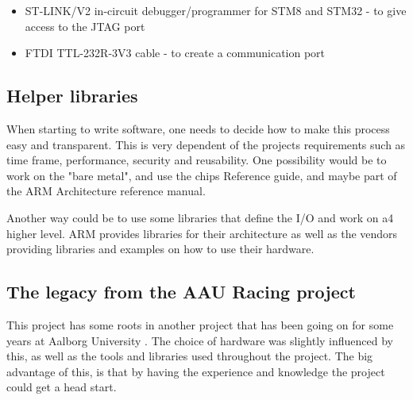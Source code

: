 \begin{itemize}[noitemsep]
	\item ST-LINK/V2 in-circuit debugger/programmer for STM8 and STM32
	\cite{st_link} - to give access to the JTAG port
	\item FTDI TTL-232R-3V3 cable \cite{ttl_usb} - to create a communication
	port
\end{itemize}

\subsection{Helper libraries}
When starting to write software, one needs to decide how to make this
process easy and transparent. This is very dependent of the
project\textquotesingle s requirements such as time frame, performance,
security and reusability. One possibility would be to work on the
"bare metal", and
use the chip\textquotesingle s Reference guide, and maybe part of the
ARM Architecture reference manual.

Another way could be to use some libraries that define the I/O and work
on a4 higher level. ARM provides libraries for their architecture
as well as the vendors providing libraries and examples on how to use their
hardware.

\subsection{The legacy from the AAU Racing project}
This project has some roots in another project that has been going on
for some years at Aalborg University \cite{aauracing}.
The choice of hardware was
slightly influenced by this, as well as the tools and libraries used
throughout the project. The big advantage of this, is that by having the
experience and knowledge the project could get a head start.

